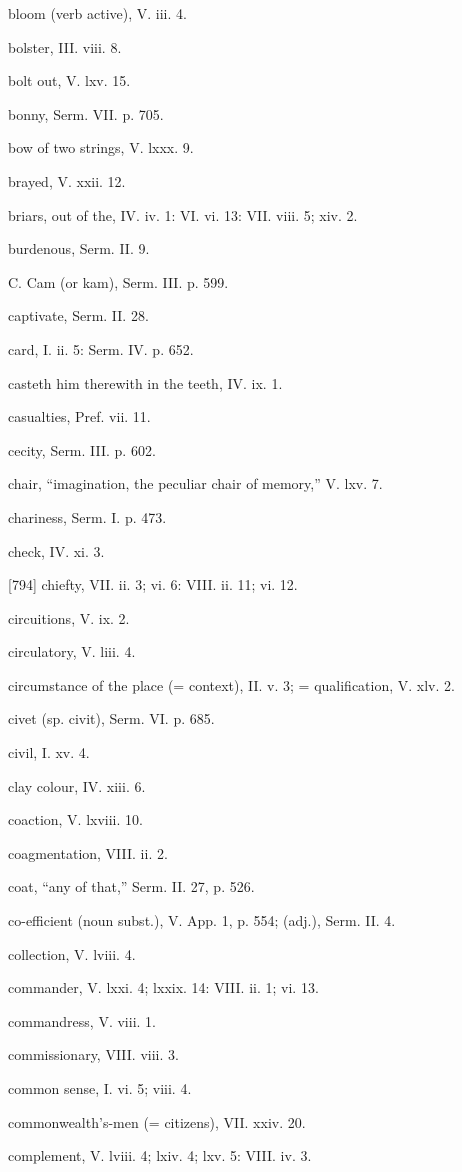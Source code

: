 bloom (verb active), V. iii. 4.

bolster, III. viii. 8.

bolt out, V. lxv. 15.

bonny, Serm. VII. p. 705.

bow of two strings, V. lxxx. 9.

brayed, V. xxii. 12.

briars, out of the, IV. iv. 1: VI. vi. 13: VII. viii. 5; xiv. 2.

burdenous, Serm. II. 9.

C.
Cam (or kam), Serm. III. p. 599.

captivate, Serm. II. 28.

card, I. ii. 5: Serm. IV. p. 652.

casteth him therewith in the teeth, IV. ix. 1.

casualties, Pref. vii. 11.

cecity, Serm. III. p. 602.

chair, “imagination, the peculiar chair of memory,” V. lxv. 7.

chariness, Serm. I. p. 473.

check, IV. xi. 3.

[794]
chiefty, VII. ii. 3; vi. 6: VIII. ii. 11; vi. 12.

circuitions, V. ix. 2.

circulatory, V. liii. 4.

circumstance of the place (= context), II. v. 3; = qualification, V. xlv. 2.

civet (sp. civit), Serm. VI. p. 685.

civil, I. xv. 4.

clay colour, IV. xiii. 6.

coaction, V. lxviii. 10.

coagmentation, VIII. ii. 2.

coat, “any of that,” Serm. II. 27, p. 526.

co-efficient (noun subst.), V. App. 1, p. 554; (adj.), Serm. II. 4.

collection, V. lviii. 4.

commander, V. lxxi. 4; lxxix. 14: VIII. ii. 1; vi. 13.

commandress, V. viii. 1.

commissionary, VIII. viii. 3.

common sense, I. vi. 5; viii. 4.

commonwealth’s-men (= citizens), VII. xxiv. 20.

complement, V. lviii. 4; lxiv. 4; lxv. 5: VIII. iv. 3.

